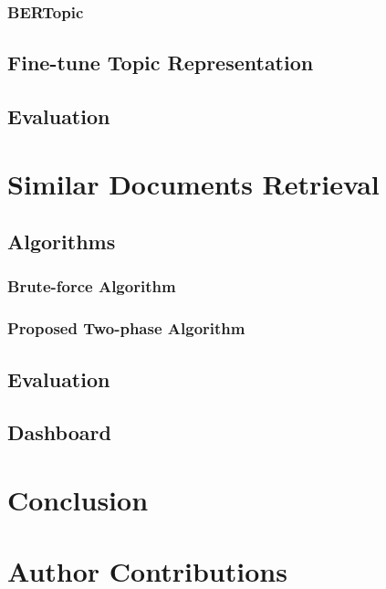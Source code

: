 \documentclass[12pt]{article}
\begin{document}
        \subsubsection{BERTopic}
            
    \subsection{Fine-tune Topic Representation}
        
    \subsection{Evaluation}
        

\section{Similar Documents Retrieval}
    \subsection{Algorithms}
        \subsubsection{Brute-force Algorithm}
            
        \subsubsection{Proposed Two-phase Algorithm}
            
    \subsection{Evaluation}
        
    \subsection{Dashboard}
        

\section{Conclusion}
    

\section{Author Contributions}
    



\end{document}
